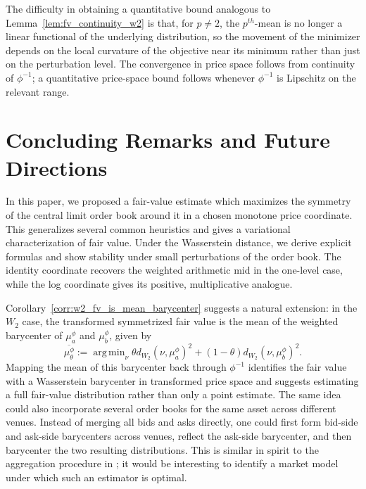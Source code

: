\documentclass[11pt]{article}
\theoremstyle{plain}
\theoremstyle{definition}
\numberwithin{equation}{section}
\DeclareMathOperator*{\argmin}{arg\,min}
\begin{document}
The difficulty in obtaining a quantitative bound analogous to Lemma~\ref{lem:fv_continuity_w2}
is that, for $p \neq 2$, the $p^{th}$-mean is no longer a linear functional of the
underlying distribution, so the movement of the minimizer depends on the local
curvature of the objective near its minimum rather than just on the perturbation level.
The convergence in price space follows from continuity of $\phi^{-1}$; a quantitative price-space bound follows whenever $\phi^{-1}$ is Lipschitz on the relevant range.


\section{Concluding Remarks and Future Directions}

\noindent In this paper, we proposed a fair-value estimate which maximizes the
symmetry of the central limit order book around it in a chosen monotone price coordinate. This generalizes several
common heuristics and gives a variational characterization of fair value. Under
the Wasserstein distance, we derive explicit formulas and show stability under
small perturbations of the order book. The identity coordinate recovers the weighted arithmetic mid in the one-level case, while the log coordinate gives its positive, multiplicative analogue.

Corollary~\ref{corr:w2_fv_is_mean_barycenter} suggests a natural extension: in
the $W_2$ case, the transformed symmetrized fair value is the mean of the weighted
barycenter of $\mu_a^\phi$ and $\mu_b^\phi$, given by
%
    \[\overline{\mu_\theta^\phi} := \argmin_{\nu}
\theta d_{W_2}(\nu,\mu_a^\phi)^2+(1-\theta)d_{W_2}(\nu,\mu_b^\phi)^2.\]
%
Mapping the mean of this barycenter back through $\phi^{-1}$ identifies the fair value with a Wasserstein barycenter in transformed price space and suggests
estimating a full fair-value distribution rather than only a point estimate. The
same idea could also incorporate several order books for the same asset across
different venues. Instead of merging all bids and asks directly, one could first
form bid-side and ask-side barycenters across venues, reflect the ask-side
barycenter, and then barycenter the two resulting distributions. This is similar
in spirit to the aggregation procedure in \cite{raban2024_aggregate_ratings_wasserstein_barycenters};
it would be interesting to identify a market model under which such an estimator
is optimal.
\end{document}
